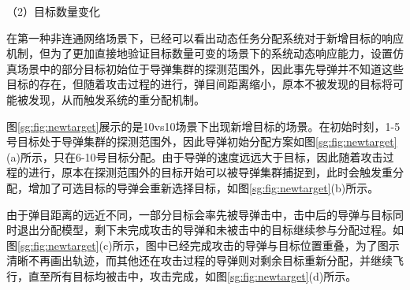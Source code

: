 （2）目标数量变化

在第一种非连通网络场景下，已经可以看出动态任务分配系统对于新增目标的响应机制，但为了更加直接地验证目标数量可变的场景下的系统动态响应能力，设置仿真场景中的部分目标初始位于导弹集群的探测范围外，因此事先导弹并不知道这些目标的存在，但随着攻击过程的进行，弹目间距离缩小，原本不被发现的目标将可能被发现，从而触发系统的重分配机制。

图\ref{sg:fig:newtarget}展示的是10vs10场景下出现新增目标的场景。在初始时刻，1-5号目标处于导弹集群的探测范围外，因此导弹初始分配方案如图\ref{sg:fig:newtarget}(a)所示，只在6-10号目标分配。由于导弹的速度远远大于目标，因此随着攻击过程的进行，原本在探测范围外的目标开始可以被导弹集群捕捉到，此时会触发重分配，增加了可选目标的导弹会重新选择目标，如图\ref{sg:fig:newtarget}(b)所示。

由于弹目距离的远近不同，一部分目标会率先被导弹击中，击中后的导弹与目标同时退出分配模型，剩下未完成攻击的导弹和未被击中的目标继续参与分配过程。如图\ref{sg:fig:newtarget}(c)所示，图中已经完成攻击的导弹与目标位置重叠，为了图示清晰不再画出轨迹，而其他还在攻击过程的导弹则对剩余目标重新分配，并继续飞行，直至所有目标均被击中，攻击完成，如图\ref{sg:fig:newtarget}(d)所示。

